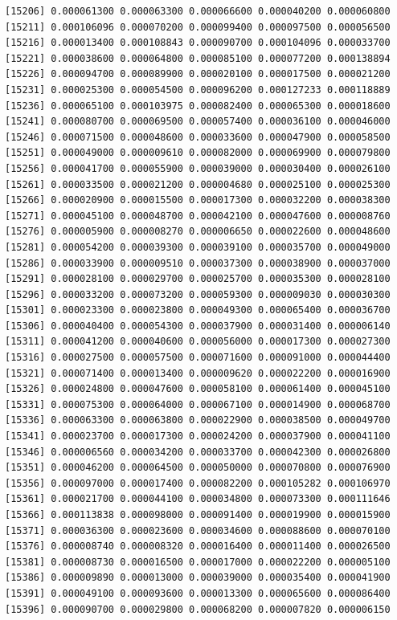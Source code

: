 \documentclass[]{article}
\begin{document}
\begin{verbatim}
[15206] 0.000061300 0.000063300 0.000066600 0.000040200 0.000060800
[15211] 0.000106096 0.000070200 0.000099400 0.000097500 0.000056500
[15216] 0.000013400 0.000108843 0.000090700 0.000104096 0.000033700
[15221] 0.000038600 0.000064800 0.000085100 0.000077200 0.000138894
[15226] 0.000094700 0.000089900 0.000020100 0.000017500 0.000021200
[15231] 0.000025300 0.000054500 0.000096200 0.000127233 0.000118889
[15236] 0.000065100 0.000103975 0.000082400 0.000065300 0.000018600
[15241] 0.000080700 0.000069500 0.000057400 0.000036100 0.000046000
[15246] 0.000071500 0.000048600 0.000033600 0.000047900 0.000058500
[15251] 0.000049000 0.000009610 0.000082000 0.000069900 0.000079800
[15256] 0.000041700 0.000055900 0.000039000 0.000030400 0.000026100
[15261] 0.000033500 0.000021200 0.000004680 0.000025100 0.000025300
[15266] 0.000020900 0.000015500 0.000017300 0.000032200 0.000038300
[15271] 0.000045100 0.000048700 0.000042100 0.000047600 0.000008760
[15276] 0.000005900 0.000008270 0.000006650 0.000022600 0.000048600
[15281] 0.000054200 0.000039300 0.000039100 0.000035700 0.000049000
[15286] 0.000033900 0.000009510 0.000037300 0.000038900 0.000037000
[15291] 0.000028100 0.000029700 0.000025700 0.000035300 0.000028100
[15296] 0.000033200 0.000073200 0.000059300 0.000009030 0.000030300
[15301] 0.000023300 0.000023800 0.000049300 0.000065400 0.000036700
[15306] 0.000040400 0.000054300 0.000037900 0.000031400 0.000006140
[15311] 0.000041200 0.000040600 0.000056000 0.000017300 0.000027300
[15316] 0.000027500 0.000057500 0.000071600 0.000091000 0.000044400
[15321] 0.000071400 0.000013400 0.000009620 0.000022200 0.000016900
[15326] 0.000024800 0.000047600 0.000058100 0.000061400 0.000045100
[15331] 0.000075300 0.000064000 0.000067100 0.000014900 0.000068700
[15336] 0.000063300 0.000063800 0.000022900 0.000038500 0.000049700
[15341] 0.000023700 0.000017300 0.000024200 0.000037900 0.000041100
[15346] 0.000006560 0.000034200 0.000033700 0.000042300 0.000026800
[15351] 0.000046200 0.000064500 0.000050000 0.000070800 0.000076900
[15356] 0.000097000 0.000017400 0.000082200 0.000105282 0.000106970
[15361] 0.000021700 0.000044100 0.000034800 0.000073300 0.000111646
[15366] 0.000113838 0.000098000 0.000091400 0.000019900 0.000015900
[15371] 0.000036300 0.000023600 0.000034600 0.000088600 0.000070100
[15376] 0.000008740 0.000008320 0.000016400 0.000011400 0.000026500
[15381] 0.000008730 0.000016500 0.000017000 0.000022200 0.000005100
[15386] 0.000009890 0.000013000 0.000039000 0.000035400 0.000041900
[15391] 0.000049100 0.000093600 0.000013300 0.000065600 0.000086400
[15396] 0.000090700 0.000029800 0.000068200 0.000007820 0.000006150

\end{verbatim}
\end{document}
